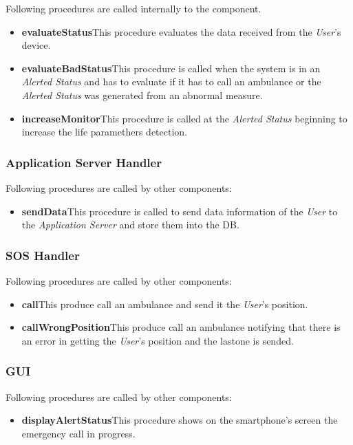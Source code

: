 \myparagraph{}
Following procedures are called internally to the component.
\begin{itemize}
  \item \textbf{evaluateStatus}\quad This procedure evaluates the data received from the \textit{User}'s device.
  \item \textbf{evaluateBadStatus}\quad This procedure is called when the system is in an \textit{Alerted Status} and has to evaluate if it has to call an ambulance or the \textit{Alerted Status} was generated from an abnormal measure.
  \item \textbf{increaseMonitor}\quad This procedure is called at the \textit{Alerted Status} beginning to increase the life paramethers detection.
\end{itemize}

\subsubsection{Application Server Handler}
Following procedures are called by other components:
\begin{itemize}
  \item \textbf{sendData}\quad This procedure is called to send data information of the \textit{User} to the \textit{Application Server} and store them into the DB.
\end{itemize}

\subsubsection{SOS Handler}
Following procedures are called by other components:
\begin{itemize}
  \item \textbf{call}\quad This produce call an ambulance and send it the \textit{User}'s position.
  \item \textbf{callWrongPosition}\quad This produce call an ambulance notifying that there is an error in getting the \textit{User}'s position and the lastone is sended.
\end{itemize}

\subsubsection{GUI}
Following procedures are called by other components:
\begin{itemize}
  \item \textbf{displayAlertStatus}\quad This procedure shows on the smartphone's screen the emergency call in progress.
\end{itemize}

